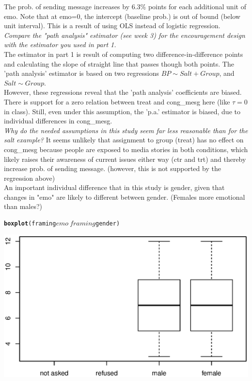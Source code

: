 \documentclass{article}\usepackage{graphicx, color}
\makeatletter
\newcommand{\hlfunctioncall}[1]{\textcolor[rgb]{0.501960784313725,0,0.329411764705882}{\textbf{#1}}}%
\newenvironment{kframe}{%
 \def\at@end@of@kframe{}%
 \ifinner\ifhmode%
  \def\at@end@of@kframe{\end{minipage}}%
  \begin{minipage}{\columnwidth}%
 \fi\fi%
 \def\FrameCommand##1{\hskip\@totalleftmargin \hskip-\fboxsep
 \colorbox{shadecolor}{##1}\hskip-\fboxsep
     \hskip-\linewidth \hskip-\@totalleftmargin \hskip\columnwidth}%
 \MakeFramed {\advance\hsize-\width
   \@totalleftmargin\z@ \linewidth\hsize
   \@setminipage}}%
 {\par\unskip\endMakeFramed%
 \at@end@of@kframe}
\newenvironment{knitrout}{}{} %
\makeatother
\begin{document}
The prob. of sending message increases by 6.3\% points for each additional unit of emo. Note that at emo=0, the intercept (baseline prob.) is out of bound (below unit interval). This is a result of using OLS instead of logistic regression.\\

\emph{Compare the "path analysis" estimator (see week 3) for the encouragement design with the estimator you used in part 1.}\\
The estimator in part 1 is result of computing two difference-in-difference points and calculating the slope of straight line that passes though both points.
The 'path analysis' estimator is based on two regressions $BP \sim Salt + Group$, and $Salt\sim Group$.\\
However, these regressions reveal that the 'path analysis' coefficients are biased. There is support for a zero relation between treat and cong\_mesg here (like $\tau=0$ in class). Still, even under this assumption, the 'p.a.' estimator is biased, due to individual differences in cong\_mesg.\\

\emph{Why do the needed assumptions in this study seem far less reasonable than for the salt example?}
It seems unlikely that assignment to group (treat) has no effect on cong\_mesg because people are exposed to media stories in both conditions, which likely raises their awareness of current issues either way (ctr and trt) and thereby increase prob. of sending message. (however, this is not supported by the regression above)\\
An important individual difference that in this study is gender, given that changes in "emo" are likely to different between gender. (Females more emotional than males?) 
\begin{knitrout}
\color{fgcolor}\begin{kframe}
\begin{alltt}
\hlfunctioncall{boxplot}(framing$emo~framing$gender)
\end{alltt}
\end{kframe}

{\centering \includegraphics[width=\linewidth]{plots/unnamed-chunk-11} 

}



\end{knitrout}
\end{document}
